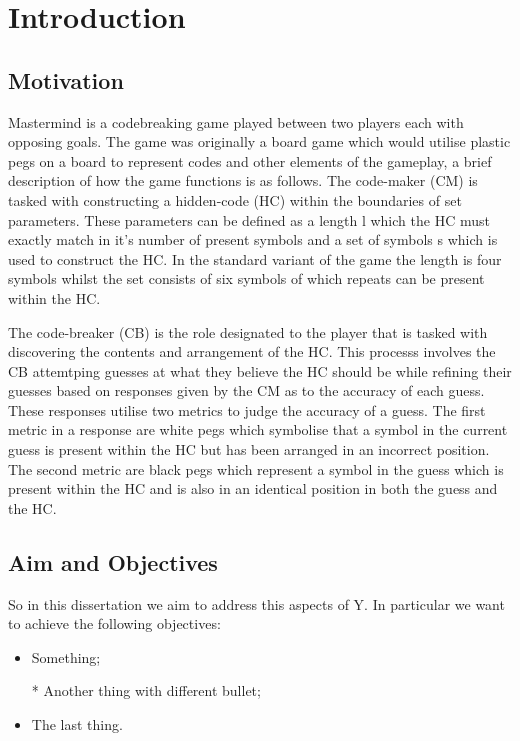 \chapter{Introduction}
\label{cha:intro}

\section{Motivation}
\label{sec:intro_motiv}

Mastermind is a codebreaking game played between two players each with opposing goals. The game was originally a board game which would utilise plastic pegs on a board to represent codes and other elements of the gameplay, a brief description of how the game functions is as follows. The code-maker (CM) is tasked with constructing a hidden-code (HC) within the boundaries of set parameters. These parameters can be defined as a length l which the HC must exactly match in it's number of present symbols and a set of symbols s which is used to construct the HC. In the standard variant of the game the length is four symbols whilst the set consists of six symbols of which repeats can be present within the HC.

The code-breaker (CB) is the role designated to the player that is tasked with discovering the contents and arrangement of the HC. This processs involves the CB attemtping guesses at what they believe the HC should be while refining their guesses based on responses given by the CM as to the accuracy of each guess. These responses utilise two metrics to judge the accuracy of a guess. The first metric in a response are white pegs which symbolise that a symbol in the current guess is present within the HC but has been arranged in an incorrect position. The second metric are black pegs which represent a symbol in the guess which is present within the HC and is also in an identical position in both the guess and the HC.

\section{Aim and Objectives}
\label{sec:intro_aim}

So in this dissertation we aim to address this aspects of Y. In particular we want to achieve the following objectives:
\begin{itemize}
    \item Something;
    \item [*] Another thing with different bullet;
    \item The last thing.
\end{itemize}

